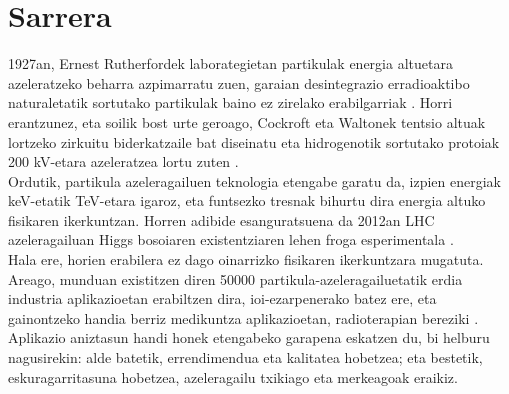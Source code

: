 \documentclass[12pt]{article}
\numberwithin{figure}{section}
\numberwithin{equation}{section}
\newcommand\blankpage{%
    \null
    \thispagestyle{empty}%
    \addtocounter{page}{-1}%
    \newpage}
\begin{document}
\begin{titlepage}
\vspace{1cm}

\hspace{-3.5cm}
\noindent{}
\end{titlepage}


\blankpage

\tableofcontents
\thispagestyle{empty}
\setcounter{page}{0}
\newpage

\section{Sarrera}
1927an, Ernest Rutherfordek laborategietan partikulak energia altuetara azeleratzeko beharra azpimarratu zuen, garaian desintegrazio erradioaktibo naturaletatik sortutako partikulak baino ez zirelako erabilgarriak \cite{rutherford_address_1997}. Horri erantzunez, eta soilik bost urte geroago, Cockroft eta Waltonek tentsio altuak lortzeko zirkuitu biderkatzaile bat diseinatu eta hidrogenotik sortutako protoiak 200 kV-etara azeleratzea lortu zuten \cite{cockcroft_experiments_1997}. \\

Ordutik, partikula azeleragailuen teknologia etengabe garatu da, izpien energiak keV-etatik TeV-etara igaroz, eta funtsezko tresnak bihurtu dira energia altuko fisikaren ikerkuntzan. Horren adibide esanguratsuena da 2012an LHC azeleragailuan Higgs bosoiaren existentziaren lehen froga esperimentala \cite{aad_observation_2012}. \\

Hala ere, horien erabilera ez dago oinarrizko fisikaren ikerkuntzara mugatuta. Areago, munduan existitzen diren 50000 partikula-azeleragailuetatik erdia industria aplikazioetan erabiltzen dira, ioi-ezarpenerako batez ere, eta gainontzeko handia berriz medikuntza aplikazioetan, radioterapian bereziki \cite{sheehy_applications_2024}. Aplikazio aniztasun handi honek etengabeko garapena eskatzen du, bi helburu nagusirekin: alde batetik, errendimendua eta kalitatea hobetzea; eta bestetik, eskuragarritasuna hobetzea, azeleragailu txikiago eta merkeagoak eraikiz.
\end{document}
